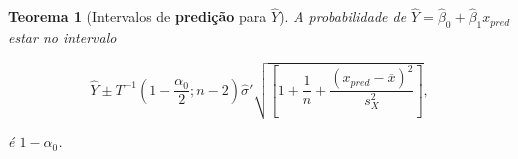 \documentclass{article}
\newtheorem{theorem}{Teorema}
\begin{document}
	\begin{theorem}[Intervalos de \textbf{predição} para $\hat{Y}$]
		A probabilidade de $\hat{Y} = \hat{\beta}_0 + \hat{\beta}_1 x_{pred}$ estar no intervalo
		
		$$\hat{Y} \pm T^{-1} (1 - \frac{\alpha_0}{2}; n - 2) \hat{\sigma}' \sqrt{\left [ 1 + \frac{1}{n} + \frac{(x_{pred} - \overline{x})^2}{s_X^2} \right ]},$$
		
		é $1 - \alpha_0$.
	\end{theorem}
	
\end{document}
